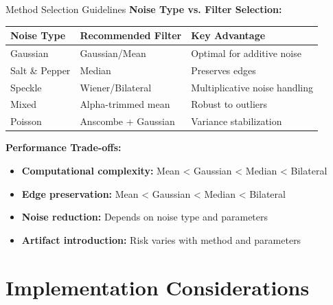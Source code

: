 \documentclass[aspectratio=169,10pt]{beamer}
\begin{document}
\begin{frame}{Method Selection Guidelines}
\textbf{Noise Type vs. Filter Selection:}

\begin{center}
\begin{tabular}{|l|l|l|}
\hline
\textbf{Noise Type} & \textbf{Recommended Filter} & \textbf{Key Advantage} \\
\hline
Gaussian & Gaussian/Mean & Optimal for additive noise \\
Salt \& Pepper & Median & Preserves edges \\
Speckle & Wiener/Bilateral & Multiplicative noise handling \\
Mixed & Alpha-trimmed mean & Robust to outliers \\
Poisson & Anscombe + Gaussian & Variance stabilization \\
\hline
\end{tabular}
\end{center}

\vspace{0.5cm}
\textbf{Performance Trade-offs:}
\begin{itemize}
\item \textbf{Computational complexity:} Mean < Gaussian < Median < Bilateral
\item \textbf{Edge preservation:} Mean < Gaussian < Median < Bilateral
\item \textbf{Noise reduction:} Depends on noise type and parameters
\item \textbf{Artifact introduction:} Risk varies with method and parameters
\end{itemize}
\end{frame}

\section{Implementation Considerations}
\end{document}
